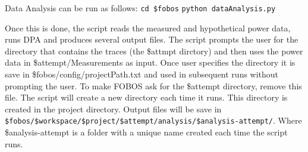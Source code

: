 Data Analysis can be run as follows: \newline
\texttt{cd \$fobos} \newline
\texttt{python dataAnalysis.py} \newline

Once this is done, the script reads the measured and hypothetical power data, runs DPA and produces several output files.
The script prompts the user for the directory that contains the traces (the \$attmpt dirctory) and then uses the power data in \$attempt/Measurements as input. Once user specifies the directory it is save in \$fobos/config/projectPath.txt and used in subsequent runs without prompting the user. To make FOBOS ask for the \$attempt directory, remove this file.
The script will create a new directory each time it runs. This directory is created in the project directory.
Output files will be save in \texttt{\$fobos/\$workspace/\$project/\$attempt/analysis/\$analysis-attempt/}.
Where \$analysis-attempt is a folder with a unique name created each time the script runs.
